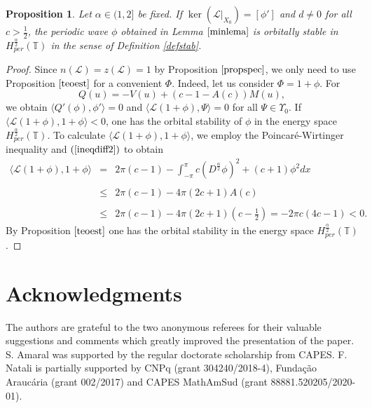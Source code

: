 \documentclass[12pt,reqno]{amsart}
\newcommand{\2}{L^2_{per}(0, T)}
\newtheorem{prop}{Proposition}[section]
\newcommand{\Hper}{{H_{per}^{\frac{\alpha}{2}}(\mathbb{T})}}
\numberwithin{equation}{section}
\numberwithin{figure}{section}
\begin{document}
\begin{prop}
	Let $\alpha\in(1,2]$ be fixed. If $\ker\left(\mathcal{L}|_{X_0}\right)=[\phi']$ and $d\neq0$ for all $c>\frac{1}{2}$, the periodic wave $\phi$ obtained in Lemma $\ref{minlema}$ is orbitally stable in $\Hper$ in the sense of Definition \ref{defstab}.
\end{prop}
\begin{proof}
	Since $n(\mathcal{L})=z(\mathcal{L})=1$ by Proposition $\ref{propspec}$, we only need to use Proposition $\ref{teoest}$ for a convenient $\Phi$. Indeed, let us consider $\Phi=1+\phi$. For $$Q(u)=-V(u)+(c-1-A(c))M(u),$$ we obtain $\langle Q'(\phi),\phi'\rangle=0$ and $\langle\mathcal{L}(1+\phi),\Psi\rangle=0$ for all $\Psi\in \Upsilon_0$. If  $\langle \mathcal{L}(1+\phi),1+\phi\rangle<0$, one has the orbital stability of $\phi$ in the energy space $\Hper$. To calculate $\langle \mathcal{L}(1+\phi),1+\phi\rangle$, we employ the Poincar\'e-Wirtinger inequality and $(\ref{ineqdiff2})$ to obtain
	\begin{equation}\label{simpfor2}
		\begin{array}{lll}\langle\mathcal{L}(1+\phi),1+\phi\rangle&=&\displaystyle2\pi(c-1)- \displaystyle \int_{-\pi}^{\pi}c(D^{\frac{\alpha}{2}}\phi)^2+\left(c+1\right)\phi^2dx\\\\
			&\leq& 2\pi(c-1)-4\pi(2c+1)A(c)\\\\
			&\leq& 2\pi(c-1)-4\pi(2c+1)\left(c-\frac{1}{2}\right)=-2\pi c(4c-1)<0.
		\end{array}
	\end{equation}
	By Proposition $\ref{teoest}$ one has the orbital stability in the energy space $\Hper$.
\end{proof}


\section*{Acknowledgments} The authors are grateful to the two anonymous referees for their valuable suggestions and comments which greatly improved the presentation of the paper. S. Amaral was supported by the regular doctorate scholarship from CAPES. F. Natali is partially supported by CNPq (grant 304240/2018-4), Funda\c{c}\~ao Arauc\'aria (grant 002/2017) and CAPES MathAmSud (grant 88881.520205/2020-01).
\end{document}
